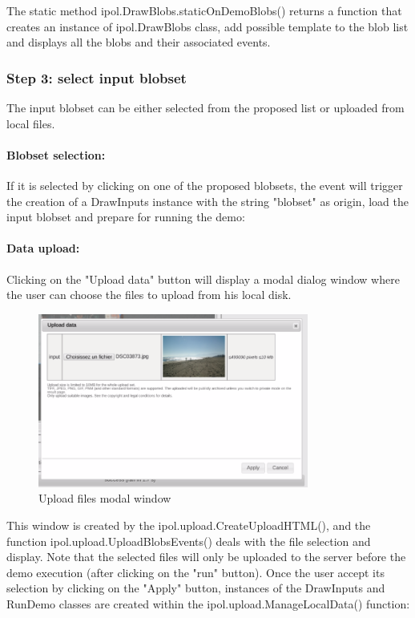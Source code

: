 The static method ipol.DrawBlobs.staticOnDemoBlobs() returns a function
that creates an instance of ipol.DrawBlobs class, add possible template
to the blob list and displays all the blobs and their associated events.

\subsubsection{Step 3: select input blobset}

The input blobset can be either selected from the proposed list or uploaded from 
local files.
\paragraph{Blobset selection:}
If it is selected by clicking on one of the proposed blobsets, the event will
trigger the creation of a DrawInputs instance with the string "blobset" as origin,
load the input blobset and prepare for running the demo:


\paragraph{Data upload:}

Clicking on the "Upload data" button will display a modal dialog window
where the user can choose the files to upload from his local disk.
\begin{figure}[H]
  \centering
  \includegraphics[width=3.5in]{Images/uploadwindow_capture}
  \caption{Upload files modal window}
  \label{img:uploadwindow_snapshot}
\end{figure}

This window is created by the ipol.upload.CreateUploadHTML(), and the function
ipol.upload.UploadBlobsEvents() deals with the file selection and display.
Note that the selected files will only be uploaded to the server before the
demo execution (after clicking on the "run" button).
Once the user accept its selection by clicking on the "Apply" button, 
instances of the DrawInputs and RunDemo classes are created within the 
ipol.upload.ManageLocalData() function:


